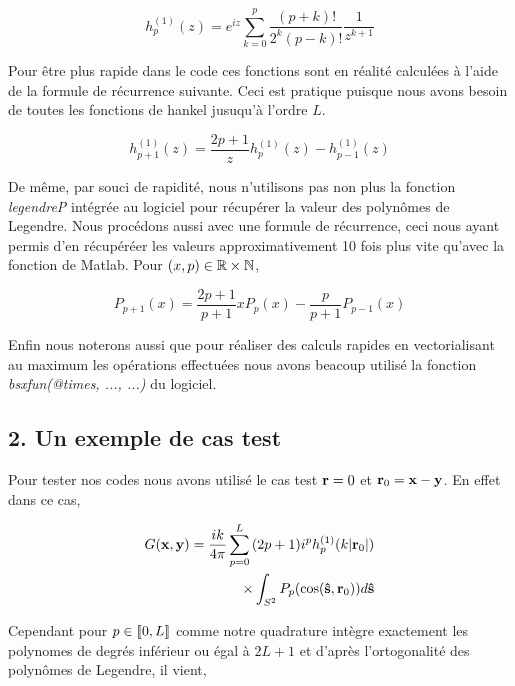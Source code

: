 \documentclass[10pt]{article}
\begin{document}
\begin{multicols}{2}
\begin{equation}
	h^{(1)}_{p}(z) = e^{iz}\sum_{k=0}^{p}{\frac{(p+k)!}{2^{k}(p-k)!}\frac{1}{z^{k+1}}}
\end{equation}

Pour être plus rapide dans le code ces fonctions sont en réalité calculées à l'aide de la formule de récurrence suivante. Ceci est pratique puisque nous avons besoin de toutes les fonctions de hankel jusuqu'à l'ordre $L$.

\begin{equation}
	h_{p+1}^{(1)}(z) =  \frac{2p+1}{z}h_{p}^{(1)}(z) - h_{p-1}^{(1)}(z) 
\end{equation}

De même, par souci de rapidité, nous n'utilisons pas non plus la fonction \textit{legendreP} intégrée au logiciel pour récupérer la valeur des polynômes de Legendre. Nous procédons aussi avec une formule de récurrence, ceci nous ayant permis d'en récupéréer les valeurs approximativement 10 fois plus vite qu'avec la fonction de Matlab. Pour  $(x,p) \in \mathbb{R}\times\mathbb{N}$, 

\begin{equation}
	P_{p+1}(x) =  \frac{2p+1}{p+1}xP_{p}(x) - \frac{p}{p+1}P_{p-1}(x) 
\end{equation}


Enfin nous noterons aussi que pour réaliser des calculs rapides en vectorialisant au maximum les opérations effectuées nous avons beacoup utilisé la fonction \textit{bsxfun(@times, ..., ...)} du logiciel.





\vspace*{10pt}


\subsection*{2. Un exemple de cas test}

Pour tester nos codes nous avons utilisé le cas test ${\bf r} = 0$ et ${\bf r}_0 = {\bf x} - {\bf y}$. En effet dans ce cas,

\begin{equation}
\begin{split}
G({\bf x},{\bf y}) = \frac{ik}{4\pi}\sum_{p=0}^{L}{} (2p+1)i^{p}h_p^{(1)}(k|{\bf r}_0|)  \\
 \times\int_{S^{2}}P_p(\cos({\bf \hat{s}}, {\bf r}_0))d{\bf \hat{s}} 
\end{split}
\end{equation}

Cependant pour $p\in \llbracket 0,L \rrbracket $ comme notre quadrature intègre exactement les polynomes de degrés inférieur ou égal à $2L+1$ et d'après l'ortogonalité des polynômes de Legendre, il vient, 


\end{multicols}
\end{document}
